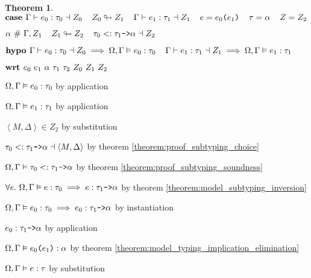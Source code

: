 \documentclass[acmsmall]{acmart}
\theoremstyle{definition}
\newtheorem{theorem}{Theorem}[section]
\begin{document}
\begin{theorem}
  \item \Z $\textbf{case } 
    \Gamma \vdash e_0 : \tau_0 \dashv Z_0
    \hspace{4mm}
    Z_0 \looparrowright Z_1
    \hspace{4mm}
    \Gamma \vdash e_1 : \tau_1 \dashv Z_1
    \hspace{4mm}
    e = \texttt{$e_0$($e_1$)} 
    \hspace{4mm} 
    \tau = \alpha 
    \hspace{4mm}
    Z = Z_2
  $ 
  \item \Z $ 
    \alpha\ \#\ \Gamma, Z_1
    \hspace{4mm}
    Z_1 \looparrowright Z_2
    \hspace{4mm}
    \tau_0 <: \texttt{$\tau_1$->$\alpha$} \dashv Z_2
  $ 
  \item \Z $\textbf{hypo } 
    \Gamma \vdash e_0 : \tau_0 \dashv Z_0
    \implies 
    \Omega, \Gamma \vDash e_0 : \tau_0
    \hspace{4mm}
    \Gamma \vdash e_1 : \tau_1 \dashv Z_1
    \implies 
    \Omega, \Gamma \vDash e_1 : \tau_1
  $ 
  \item \Z $\B{wrt } e_0\ e_1\ \alpha\ \tau_1\ \tau_2\ Z_0\ Z_1\ Z_2 $ 
  \item \Z\Z $
    \Omega, \Gamma \vDash e_0 : \tau_0
  $ by application
  \item \Z\Z $
    \Omega, \Gamma \vDash e_1 : \tau_1
  $ by application
  \item \Z\Z $
    \left<M, \Delta \right> \in Z_2
  $ by substitution 
  \item \Z\Z $
    \tau_0 <: \texttt{$\tau_1$->$\alpha$} \dashv \left<M, \Delta \right>
  $ by theorem \ref{theorem:proof_subtyping_choice} 
  \item \Z\Z $
    \Omega, \Gamma \vDash \tau_0 <: \texttt{$\tau_1$->$\alpha$} 
  $ by theorem \ref{theorem:proof_subtyping_soundness} 
  \item \Z\Z $
    \forall e .\ \Omega, \Gamma \vDash e : \tau_0 \implies e : \texttt{$\tau_1$->$\alpha$} 
  $ by theorem \ref{theorem:model_subtyping_inversion} 
  \item \Z\Z $
    \Omega, \Gamma \vDash e_0 : \tau_0 \implies e_0 : \texttt{$\tau_1$->$\alpha$} 
  $ by instantiation 
  \item \Z\Z $
    e_0 : \texttt{$\tau_1$->$\alpha$} 
  $ by application 
  \item \Z\Z $
    \Omega, \Gamma \vDash \texttt{$e_0$($e_1$)} : \alpha
  $ by theorem \ref{theorem:model_typing_implication_elimination} 
  \item \Z\Z $
    \Omega, \Gamma \vDash e : \tau
  $ by substitution 


\end{theorem}
\end{document}
